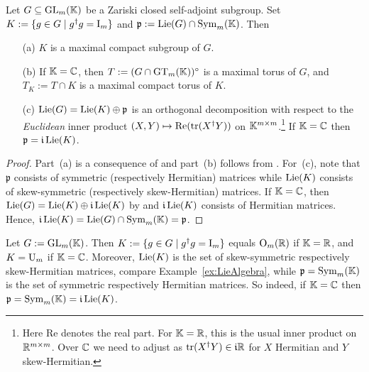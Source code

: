 \begin{prop}\label{prop:SelfAdjointProperties}
	Let $G \subseteq \operatorname{GL}_m(\mathbb K)$ be a Zariski closed self-adjoint subgroup. Set $K := \{ g \in G \mid g^{\dagger} g = \operatorname{I}_m \}$
	and $\mathfrak{p} := \operatorname{Lie}(G) \cap \operatorname{Sym}_m(\mathbb K)$. Then 
	\begin{itemize}\itemsep 1pt
		\item[(a)] $K$ is a maximal compact subgroup of $G$.
		
		\item[(b)] If $\mathbb K = \mathbb C$, then $T := (G \cap \operatorname{GT}_m(\mathbb K))^\circ$ is a maximal torus of $G$, and $T_K := T \cap K$ is a maximal compact torus of $K$.
		\item[(c)] $\operatorname{Lie}(G) = \operatorname{Lie}(K) \oplus \mathfrak{p}$ is an orthogonal decomposition with respect to the \emph{Euclidean} inner product $(X,Y) \mapsto \mathrm{Re}(\operatorname{tr}(X^{\dagger} Y))$ on $\mathbb K^{m \times m}$.\footnote{Here $\mathrm{Re}$ denotes the real part. For $\mathbb K = \mathbb R$, this is the usual inner product on $\mathbb R^{m \times m}$. Over $\mathbb C$ we need to adjust as $\operatorname{tr}(X^{\dagger} Y) \in \mathfrak{i} \mathbb R$ for $X$ Hermitian and $Y$ skew-Hermitian.}
		If $\mathbb K = \mathbb C$ then $\mathfrak{p} = \mathfrak{i} \operatorname{Lie}(K)$.
	\end{itemize}
\end{prop}

\begin{proof}
	Part~(a) is a consequence of \cite[Theorem~2.29]{Wallach} and part~(b) follows from \cite[Theorem~2.21]{Wallach}. For~(c), note that $\mathfrak{p}$ consists of symmetric (respectively Hermitian) matrices while $\operatorname{Lie}(K)$ consists of skew-symmetric (respectively skew-Hermitian) matrices. If $\mathbb K = \mathbb C$, then $\operatorname{Lie}(G) = \operatorname{Lie}(K) \oplus \mathfrak{i} \operatorname{Lie}(K)$ by \cite[Theorem~2.12]{Wallach} and $\mathfrak{i} \operatorname{Lie}(K)$ consists of Hermitian matrices. Hence, $\mathfrak{i} \operatorname{Lie}(K) = \operatorname{Lie}(G) \cap \operatorname{Sym}_m(\mathbb K) = \mathfrak{p}$.
\end{proof}

\begin{example}
	Let $G := \operatorname{GL}_m(\mathbb K)$. Then $K := \{ g \in G \mid g^{\dagger} g = \operatorname{I}_m \}$ equals $\operatorname{O}_m(\mathbb R)$ if $\mathbb K=\mathbb R$, and $K = \operatorname{U}_m$ if $\mathbb K = \mathbb C$. Moreover, $\operatorname{Lie}(K)$ is the set of skew-symmetric respectively skew-Hermitian matrices, compare Example~\ref{ex:LieAlgebra}, while $\mathfrak{p} = \operatorname{Sym}_m(\mathbb K)$ is the set of symmetric respectively Hermitian matrices. So indeed, if $\mathbb K = \mathbb C$ then $\mathfrak{p} = \operatorname{Sym}_m(\mathbb K) = \mathfrak{i} \operatorname{Lie}(K)$.
	\hfill\exSymbol
\end{example}

